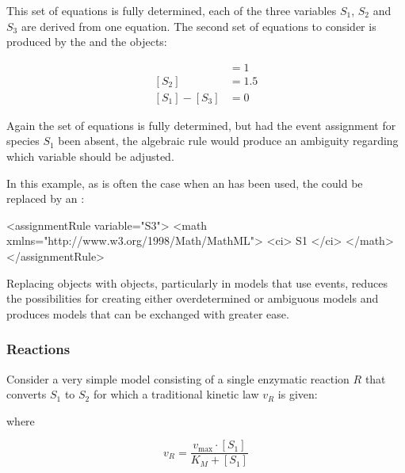 This set of equations is fully determined, \ie each of the three
variables $S_1$, $S_2$ and $S_3$ are derived from one equation.
The second set of equations to consider is produced by the
\Event and the \AlgebraicRule objects:
\begin{linenomath}
\begin{align*}
  [S_1]         &= 1   \\[2pt]
  [S_2]         &= 1.5 \\[2pt]
  [S_1] - [S_3] &= 0
\end{align*}
\end{linenomath}

Again the set of equations is fully determined, but had the event
assignment for species $S_1$ been absent, the algebraic rule would
produce an ambiguity regarding which variable should be adjusted.

In this example, as is often the case when an \AlgebraicRule has
been used, the \AlgebraicRule could be replaced by an
\AssignmentRule:

\begin{example}
<assignmentRule variable="S3">
    <math xmlns="http://www.w3.org/1998/Math/MathML">
       <ci> S1 </ci>
    </math>
</assignmentRule>
\end{example}

Replacing \AlgebraicRule objects with \AssignmentRule objects,
particularly in models that use events, reduces the possibilities
for creating either overdetermined or ambiguous models and
produces models that can be exchanged with greater ease.


\subsubsection{Reactions}
\label{sec:bp:reactions}


Consider a very simple model consisting of a single enzymatic reaction
$R$ that converts $S_{1}$ to $S_{2}$ for which a traditional kinetic
law $v_{R}$ is given:
\begin{center}
\end{center}
where
\begin{linenomath}
  \begin{equation*}
    v_{R} = \frac{v_\text{max} \cdot [S_{1}]}{K_{M} + [S_{1}]}
  \end{equation*}
\end{linenomath}

